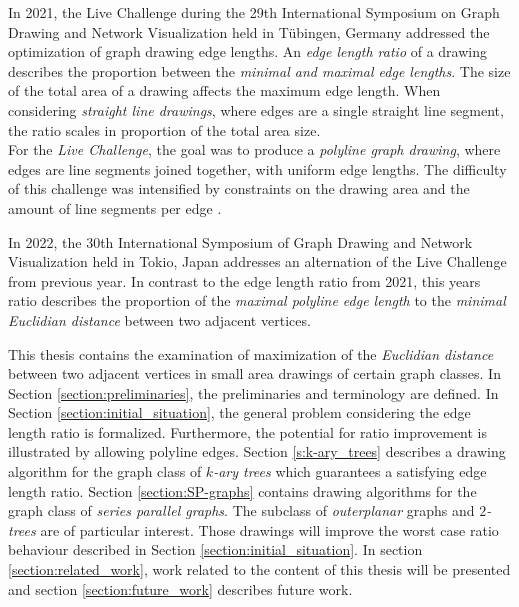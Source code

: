 \bigskip

In 2021, the Live Challenge during the 29th International Symposium on Graph Drawing and Network Visualization held in Tübingen, Germany addressed the optimization of graph drawing edge lengths. An \emph{edge length ratio} of a drawing describes the proportion between the \emph{minimal and maximal edge lengths}. The size of the total area of a drawing affects the maximum edge length. When considering \emph{straight line drawings}, where edges are a single straight line segment, the ratio scales in proportion of the total area size.\\
For the \emph{Live Challenge}, the goal was to produce a \emph{polyline graph drawing}, where edges are line segments joined together, with uniform edge lengths. 
The difficulty of this challenge was intensified by constraints on the drawing area and the amount of line segments per edge \cite{GD:2021_Challenge}.

\bigskip


In 2022, the 30th International Symposium of Graph Drawing and Network Visualization held in Tokio, Japan \cite{GD:2022_Challenge} addresses an alternation of the Live Challenge from previous year. In contrast to the edge length ratio from 2021, this years ratio describes the proportion of the \emph{maximal polyline edge length} to the \emph{minimal Euclidian distance} between two adjacent vertices. 

\bigskip


This thesis contains the examination of maximization of the \emph{Euclidian distance} between two adjacent vertices in small area drawings of certain graph classes.
In Section \ref{section:preliminaries}, the preliminaries and terminology are defined. 
In Section \ref{section:initial_situation}, the general problem considering the edge length ratio is formalized. Furthermore, the potential for ratio improvement is illustrated by allowing polyline edges. 
Section \ref{s:k-ary_trees} describes a drawing algorithm for the graph class of \emph{$k$-ary trees} which guarantees a satisfying edge length ratio.
Section \ref{section:SP-graphs} contains drawing algorithms for the graph class of \emph{series parallel graphs}. The subclass of \emph{outerplanar} graphs and \emph{$2$-trees} are of particular interest. Those drawings will improve the worst case ratio behaviour described in Section \ref{section:initial_situation}.
In section \ref{section:related_work}, work related to the content of this thesis will be presented and section \ref{section:future_work} describes future work.

